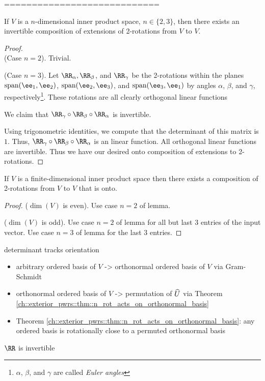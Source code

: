 ============================

\begin{lemma}
    If $V$ is a $n$-dimensional inner product space, $n \in \{2, 3\}$, then there exists an invertible composition of extensions of 2-rotations from $V$ to $V$.
\end{lemma}

\begin{proof}
    \mbox{} \\
    
    (Case $n = 2$). Trivial.
    
    (Case $n = 3$). Let $\RR_\alpha, \RR_\beta$, and $\RR_\gamma$ be the 2-rotations within the planes $\spann(\ee_1, \ee_2)$, $\spann(\ee_2, \ee_3)$, and $\spann(\ee_3, \ee_1)$ by angles $\alpha$, $\beta$, and $\gamma$, respectively\footnote{$\alpha$, $\beta$, and $\gamma$ are called \textit{Euler angles}}. These rotations are all clearly orthogonal linear functions
    
    We claim that $\RR_\gamma \circ \RR_\beta \circ \RR_\alpha$ is invertible. 
    
    Using trigonometric identities, we compute that the determinant of this matrix is $1$. Thus, $\RR_\gamma \circ \RR_\beta \circ \RR_\alpha$ is an linear function. All orthogonal linear functions are invertible. Thus we have our desired onto composition of extensions to 2-rotations.
\end{proof}

\begin{theorem}
    If $V$ is a finite-dimensional inner product space then there exists a composition of 2-rotations from $V$ to $V$ that is onto.
\end{theorem}

\begin{proof}
    ($\dim(V)$ is even). Use case $n = 2$ of lemma.
    
    ($\dim(V)$ is odd). Use case $n = 2$ of lemma for all but last 3 entries of the input vector. Use case $n = 3$ of lemma for the last 3 entries.
\end{proof}

\begin{theorem}
    determinant tracks orientation

    \begin{itemize}
        \item arbitrary ordered basis of $V$ -> orthonormal ordered basis of $V$ via Gram-Schmidt
        \item orthonormal ordered basis of $V$ -> permutation of $\widehat{U}$ via Theorem \ref{ch::exterior_pwrs::thm::n_rot_acts_on_orthonormal_basis}
        \item Theorem \ref{ch::exterior_pwrs::thm::n_rot_acts_on_orthonormal_basis}: any ordered basis is rotationally close to a permuted orthonormal basis
    \end{itemize} 

    $\RR$ is invertible
    
\end{theorem}

